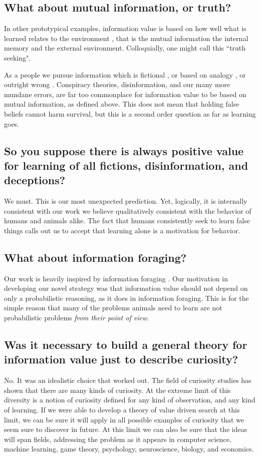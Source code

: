 \subsection*{What about mutual information, or truth?}
In other prototypical examples, information value is based on how well what is learned relates to the environment \cite{Behrens2007,Kolchinsky2018,Tishby2000}, that is the mutual information the internal memory and the external environment. Colloquially, one might call this ``truth seeking". 

As a people we pursue information which is fictional \cite{sternisko2020dark}, or based on analogy \cite{gentner1997reasoning}, or outright wrong \cite{loftus1989misinformation}. Conspiracy theories, disinformation, and our many more mundane errors, are far too commonplace for information value to be based on mutual information, as defined above. This does not mean that holding false beliefs cannot harm survival, but this is a second order question as far as learning goes. 


\subsection*{So you suppose there is always positive value for learning of all fictions, disinformation, and deceptions?}
We must. This is our most unexpected prediction. Yet, logically, it is internally consistent with our work we believe qualitatively consistent with the behavior of humans and animals alike. The fact that humans consistently seek to learn false things calls out us to accept that learning alone is a motivation for behavior.


\subsection*{What about information foraging?}
Our work is heavily inspired by information foraging \cite{Inglis2001,Reddy2016}. Our motivation in developing our novel strategy was that information value should not depend on only a probabilistic reasoning, as it does in information foraging. This is for the simple reason that many of the problems animals need to learn are not probabilistic problems \textit{from their point of view}. 


\subsection*{Was it necessary to build a general theory for information value just to describe curiosity?}
No. It was an idealistic choice that worked out. The field of curiosity studies has shown that there are many kinds of curiosity. At the extreme limit of this diversity is a notion of curiosity defined for any kind of observation, and any kind of learning. If we were able to develop a theory of value driven search at this limit, we can be sure it will apply in all possible examples of curiosity that we seem sure to discover in future. At this limit we can also be sure that the ideas will span fields, addressing the problem as it appears in computer science, machine learning, game theory, psychology, neuroscience, biology, and economics.



